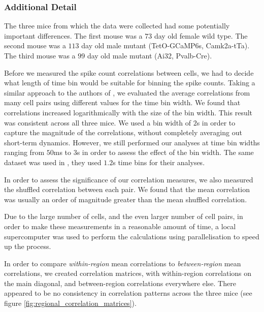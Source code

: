 \documentclass[a4paper,12pt]{article}
\theoremstyle{definition}
\begin{document}
\subsubsection*{Additional Detail}
The three mice from which the data were collected had some potentially important differences. The first mouse was a $73$ day old female wild type. The second mouse was a $113$ day old male mutant (TetO-GCaMP6s, Camk2a-tTa). The third mouse was a $99$ day old male mutant (Ai32, Pvalb-Cre).

Before we measured the spike count correlations between cells, we had to decide what length of time bin would be suitable for binning the spike counts. Taking a similar approach to the authors of \cite{cohen2}, we evaluated the average correlations from many cell pairs using different values for the time bin width. We found that correlations increased logarithmically with the size of the bin width. This result was consistent across all three mice. We used a bin width of $2$s in order to capture the magnitude of the correlations, without completely averaging out short-term dynamics. However, we still performed our analyses at time bin widths ranging from $50$ms to $3$s in order to assess the effect of the bin width. The same dataset was used in \cite{stringer}, they used $1.2$s time bins for their analyses.

In order to assess the significance of our correlation measures, we also measured the shuffled correlation between each pair. We found that the mean correlation was usually an order of magnitude greater than the mean shuffled correlation. 

Due to the large number of cells, and the even larger number of cell pairs, in order to make these measurements in a reasonable amount of time, a local supercomputer was used to perform the calculations using parallelisation to speed up the process.

In order to compare \textit{within-region} mean correlations to \textit{between-region} mean correlations, we created correlation matrices, with within-region correlations on the main diagonal, and between-region correlations everywhere else. There appeared to be no consistency in correlation patterns across the three mice (see figure \ref{fig:regional_correlation_matrices}).
\end{document}
